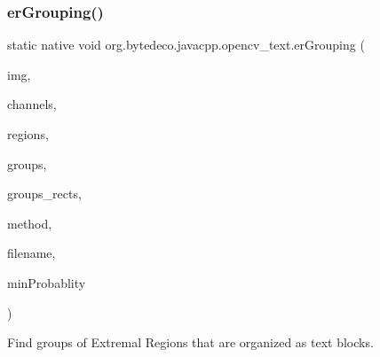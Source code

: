 \subsubsection{\texorpdfstring{er\+Grouping()}{erGrouping()}}
{\footnotesize\ttfamily static native void org.\+bytedeco.\+javacpp.\+opencv\+\_\+text.\+er\+Grouping (\begin{DoxyParamCaption}\item[{@By\+Val Mat}]{img,  }\item[{@By\+Val Mat\+Vector}]{channels,  }\item[{@By\+Ref E\+R\+Stat\+Vector\+Vector}]{regions,  }\item[{@Cast(\char`\"{}std\+::vector$<$std\+::vector$<$cv\+::\+Vec2i$>$ $>$$\ast$\char`\"{}) @By\+Ref fr.antproject.utils.Point\+Vector\+Vector}]{groups,  }\item[{@By\+Ref Rect\+Vector}]{groups\+\_\+rects,  }\item[{int}]{method,  }\item[{@Std\+String Byte\+Pointer}]{filename,  }\item[{float}]{min\+Probablity }\end{DoxyParamCaption})\hspace{0.3cm}{\ttfamily [static]}}



Find groups of Extremal Regions that are organized as text blocks. 


